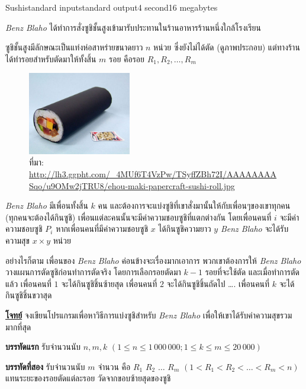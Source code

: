 \documentclass[11pt,a4paper]{article}
\begin{document}
\begin{problem}{Sushi}{standard input}{standard output}{4 second}{16 megabytes}

\textit{Benz Blaho} ได้ทำการสั่งซูชิชั้นสูงเข้ามารับประทานในร้านอาหารร้านหนึ่งใกล้โรงเรียน

ซูชิชั้นสูงมีลักษณะเป็นแท่งห่อสาหร่ายขนาดยาว $n$ หน่วย ซึ่งยังไม่ได้ตัด (ดูภาพประกอบ) แต่ทางร้านได้ทำรอยสำหรับตัดมาให้ทั้งสิ้น $m$ รอย คือรอย $R_1,R_2,…,R_m$


\begin{figure}[!h]
\centering
\includegraphics[width=0.4\textwidth]{../latex/img/1148/1148-1.jpg}
\captionsetup{justification=centering}
\caption*{ที่มา: \url{http://lh3.ggpht.com/\_4MUf6T4VzPw/TSyffZBh72I/AAAAAAAASqo/u9OMw2jTRU8/ehou-maki-papercraft-sushi-roll.jpg}}

\end{figure}

\textit{Benz Blaho} มีเพื่อนทั้งสิ้น $k$ คน และต้องการจะแบ่งซูชิที่เขาสั่งมานั้นให้กับเพื่อนๆของเขาทุกคน (ทุกคนจะต้องได้กินซูชิ) เพื่อนแต่ละคนนั้นจะมีค่าความชอบซูชิที่แตกต่างกัน โดยเพื่อนคนที่ $i$ จะมีค่าความชอบซูชิ $P_i$ หากเพื่อนคนที่มีค่าความชอบซูชิ $x$ ได้กินซูชิความยาว $y$ \textit{Benz Blaho} จะได้รับความสุข $x \times y$ หน่วย

          อย่างไรก็ตาม เพื่อนของ \textit{Benz Blaho} ค่อนข้างจะเรื่องมากเอาการ พวกเขาต้องการให้ \textit{Benz Blaho} วางแผนการตัดซูชิก่อนทำการตัดจริง โดยการเลือกรอยตัดมา $k-1$ รอยที่จะใช้ตัด และเมื่อทำการตัดแล้ว เพื่อนคนที่ $1$ จะได้กินซูชิชิ้นซ้ายสุด เพื่อนคนที่ $2$ จะได้กินซูชิชิ้นถัดไป …. เพื่อนคนที่ $k$ จะได้กินซูชิชิ้นขวาสุด
          
\bigskip
\underline{\textbf{โจทย์}}  จงเขียนโปรแกรมเพื่อหาวิธีการแบ่งซูชิสำหรับ \textit{Benz Blaho} เพื่อให้เขาได้รับค่าความสุขรวมมากที่สุด


\InputFile

\textbf{บรรทัดแรก} รับจำนวนนับ $n, m, k$  $( 1 \leq n \leq 1\,000\,000; 1 \leq k \leq m \leq 20\,000 )$

\textbf{บรรทัดที่สอง} รับจำนวนนับ $m$ จำนวน คือ $R_1$ $R_2$ $…$ $R_m$ $( 1 <  R_1 < R_2 < … < R_m < n )$ แทนระยะของรอยตัดแต่ละรอย วัดจากขอบซ้ายสุดของซูชิ


\end{problem}
\end{document}
